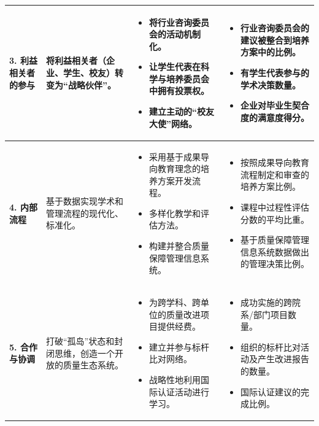 \begin{longtable}{|p{2.5cm}|p{3.5cm}|p{4.5cm}|p{3.5cm}|}
\textbf{3. 利益相关者的参与} & 将利益相关者（企业、学生、校友）转变为“战略伙伴”。 & 
\begin{itemize}
    \item 将行业咨询委员会的活动机制化。
    \item 让学生代表在科学与培养委员会中拥有投票权。
    \item 建立主动的“校友大使”网络。
\end{itemize} & 
\begin{itemize}
    \item 行业咨询委员会的建议被整合到培养方案中的比例。
    \item 有学生代表参与的学术决策数量。
    \item 企业对毕业生契合度的满意度得分。
\end{itemize} \\
\hline

\textbf{4. 内部流程} & 基于数据实现学术和管理流程的现代化、标准化。 & 
\begin{itemize}
    \item 采用基于成果导向教育理念的培养方案开发流程。
    \item 多样化教学和评估方法。
    \item 构建并整合质量保障管理信息系统。
\end{itemize} & 
\begin{itemize}
    \item 按照成果导向教育流程制定和审查的培养方案比例。
    \item 课程中过程性评估分数的平均比重。
    \item 基于质量保障管理信息系统数据做出的管理决策比例。
\end{itemize} \\
\hline

\textbf{5. 合作与协调} & 打破“孤岛”状态和封闭思维，创造一个开放的质量生态系统。 & 
\begin{itemize}
    \item 为跨学科、跨单位的质量改进项目提供经费。
    \item 建立并参与标杆比对网络。
    \item 战略性地利用国际认证活动进行学习。
\end{itemize} & 
\begin{itemize}
    \item 成功实施的跨院系/部门项目数量。
    \item 组织的标杆比对活动及产生改进报告的数量。
    \item 国际认证建议的完成比例。
\end{itemize} \\
\end{longtable}

